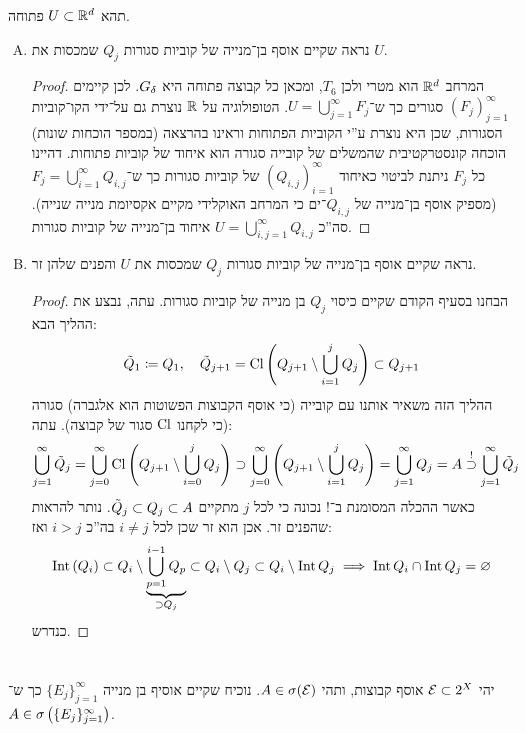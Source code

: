 \documentclass[]{../../../../tex/classes/homework}
\begin{document}
	תהא $U \subset \mathbb{R}^{d}$ פתוחה. 
	\begin{enumerate}[(A)]
		\item נראה שקיים אוסף בן־מנייה של קוביות סגורות $Q_j$ שמכסות את $U$. \begin{proof}
			המרחב $\mathbb{R}^{d}$ הוא מטרי ולכן $T_6$, ומכאן כל קבוצה פתוחה היא $G_\delta$. לכן קיימים $(F_j)_{j =1}^{\infty}$ סגורים כך ש־$U = \bigcup_{j = 1}^{\infty}F_j$. הטופולוגיה על $\mathbb{R}$ נוצרת גם על־ידי הקו־קוביות הסגורות, שכן היא נוצרת ע''י הקוביות הפתוחות וראינו בהרצאה (במספר הוכחות שונות) הוכחה קונסטרקטיבית שהמשלים של קובייה סגורה הוא איחוד של קוביות פתוחות. דהיינו כל $F_j$ ניתנת לביטוי כאיחוד $(Q_{i, j})_{i = 1}^{\infty}$ של קוביות סגורות כך ש־$F_j = \bigcup_{i = 1}^{\infty} Q_{i, j}$ (מספיק אוסף בן־מנייה של $Q_{i,j}$־ים כי המרחב האוקלידי מקיים אקסיומת מנייה שנייה). סה''כ $U = \bigcup_{i, j = 1}^{\infty}Q_{i, j}$ איחוד בן־מנייה של קוביות סגורות. 
		\end{proof}
		\item נראה שקיים אוסף בן־מנייה של קוביות סגורות $Q_j$ שמכסות את $U$ והפנים שלהן זר. \begin{proof}
			הבחנו בסעיף הקודם שקיים כיסוי $Q_j$ בן מנייה של קוביות סגורות. עתה, נבצע את ההליך הבא: 
			\[ \tilde Q_1 \coloneqq Q_1, \quad \tilde Q_{j + 1} = \operatorname{Cl} \left ( Q_{j + 1} \setminus \bigcup_{i = 1}^{j}Q_j \right ) \subset Q_{j + 1} \]
			ההליך הזה משאיר אותנו עם קובייה (כי אוסף הקבוצות הפשוטות הוא אלגברה) סגורה (כי לקחנו $\operatorname{Cl}$ סגור של קבוצה). עתה: 
			\[ \bigcup_{j = 1}^{\infty} \tilde Q_j = \bigcup_{j = 0}^{\infty}\operatorname{Cl} \left ( Q_{j + 1} \setminus \bigcup_{i = 0}^{j}Q_j \right ) \supset \bigcup_{j = 0}^{\infty}\left ( Q_{j + 1} \setminus \bigcup_{i = 1}^{j}Q_j \right ) = \bigcup_{j = 1}^{\infty}Q_j = A \overset{!}{\supset}\bigcup_{j = 1}^{\infty}\tilde Q_{j} \]
			כאשר ההכלה המסומנת ב־$!$ נכונה כי לכל $j$ מתקיים $\tilde Q_j \subset Q_j \subset A$. נותר להראות שהפנים זר. אכן הוא זר שכן לכל $i \neq j$ בה''כ $i > j$ ואז: 
			\[ \operatorname{Int} \left ( Q_{i} \right ) \subset Q_i \setminus \underbrace{\bigcup_{p = 1}^{i - 1}Q_p}_{\supset Q_j} \subset Q_i \setminus Q_j \subset Q_i \setminus \operatorname{Int} Q_j \implies \operatorname{Int} Q_i \cap \operatorname{Int} Q_j = \varnothing \]
			כנדרש. 
		\end{proof}
	\end{enumerate}
	
	\section{}
	יהי $\mathcal{E} \subset 2^{X}$ אוסף קבוצות, ותהי $A \in \sigma(\mathcal{E})$. נוכיח שקיים אוסיף בן מנייה $\{E_j\}_{j = 1}^{\infty}$ כך ש־$A \in \sigma\left ( \{E_j\}_{j = 1}^{\infty} \right )$. 
	
\end{document}
